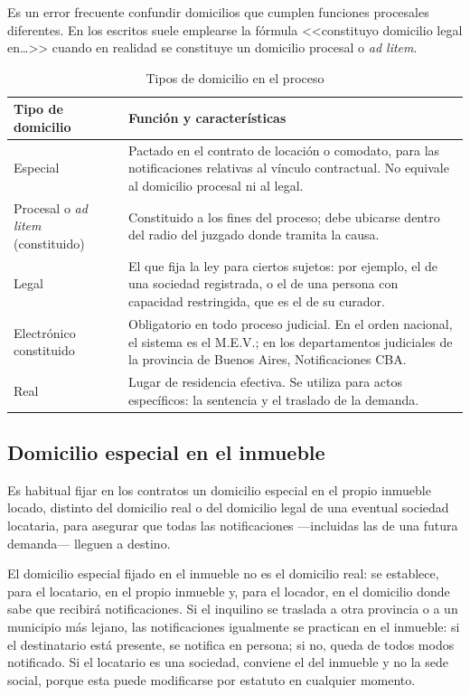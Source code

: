 \documentclass[12pt,oneside]{book}
\begin{document}
Es un error frecuente confundir domicilios que cumplen funciones procesales diferentes. En los escritos suele emplearse la fórmula <<constituyo domicilio legal en\ldots>> cuando en realidad se constituye un domicilio procesal o \emph{ad litem}.

\begin{table}[H]
\centering
\caption{Tipos de domicilio en el proceso}
\begin{tabularx}{\textwidth}{>{\raggedright\arraybackslash}p{} X}
\toprule
\textbf{Tipo de domicilio} & \textbf{Función y características} \\
\midrule
Especial & Pactado en el contrato de locación o comodato, para las notificaciones relativas al vínculo contractual. No equivale al domicilio procesal ni al legal. \\
Procesal o \emph{ad litem} (constituido) & Constituido a los fines del proceso; debe ubicarse dentro del radio del juzgado donde tramita la causa. \\
Legal & El que fija la ley para ciertos sujetos: por ejemplo, el de una sociedad registrada, o el de una persona con capacidad restringida, que es el de su curador. \\
Electrónico constituido & Obligatorio en todo proceso judicial. En el orden nacional, el sistema es el M.E.V.; en los departamentos judiciales de la provincia de Buenos Aires, Notificaciones CBA. \\
Real & Lugar de residencia efectiva. Se utiliza para actos específicos: la sentencia y el traslado de la demanda. \\
\bottomrule
\end{tabularx}
\end{table}

\subsection{Domicilio especial en el inmueble}

Es habitual fijar en los contratos un domicilio especial en el propio inmueble locado, distinto del domicilio real o del domicilio legal de una eventual sociedad locataria, para asegurar que todas las notificaciones ---incluidas las de una futura demanda--- lleguen a destino.

\begin{important}
El domicilio especial fijado en el inmueble no es el domicilio real: se establece, para el locatario, en el propio inmueble y, para el locador, en el domicilio donde sabe que recibirá notificaciones. Si el inquilino se traslada a otra provincia o a un municipio más lejano, las notificaciones igualmente se practican en el inmueble: si el destinatario está presente, se notifica en persona; si no, queda de todos modos notificado. Si el locatario es una sociedad, conviene el del inmueble y no la sede social, porque esta puede modificarse por estatuto en cualquier momento.
\end{important}
\end{document}
